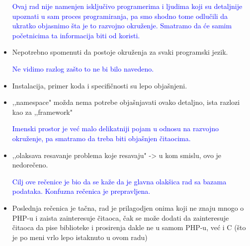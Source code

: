 \documentclass[a4paper]{report}
\newcommand{\odgovor}[1]{\textcolor{blue}{#1}}
\begin{document}
\begin{itemize}
\odgovor{Ovaj rad nije namenjen isključivo programerima i ljudima koji su detaljnije upoznati u sam proces programiranja, pa smo shodno tome odlučili da ukratko objasnimo šta je to razvojno okruženje. Smatramo da će samim početnicima ta informacija biti od koristi.}

\item Nepotrebno spomenuti da postoje okruženja za svaki programski jezik.

\odgovor{Ne vidimo razlog zašto to ne bi bilo navedeno.}

\item Instalacija, primer koda i specifičnosti su lepo objašnjeni.

\item ,,namespace" možda nema potrebe objašnjavati ovako detaljno, ista razlozi kao za ,,framework"

\odgovor{Imenski prostor je već malo delikatniji pojam u odnosu na razvojno okruženje, pa smatramo da treba biti objašnjen čitaocima. }

\item ,,olaksava resavanje problema koje resavaju" -> u kom smislu, ovo je nedorečeno.

\odgovor{Cilj ove rečenice je bio da se kaže da je glavna olakšica rad sa bazama podataka. Konfuzna rečenica je prepravljena.}

\item Poslednja rečenica je tačna, rad je prilagodjen onima koji ne znaju mnogo o PHP-u i zaista zainteresuje čitaoca, čak se može dodati da zainteresuje čitaoca da pise biblioteke i prosirenja dakle ne u samom PHP-u, već i C (što je po meni vrlo lepo istaknuto u ovom radu)
\end{itemize}
\end{document}
